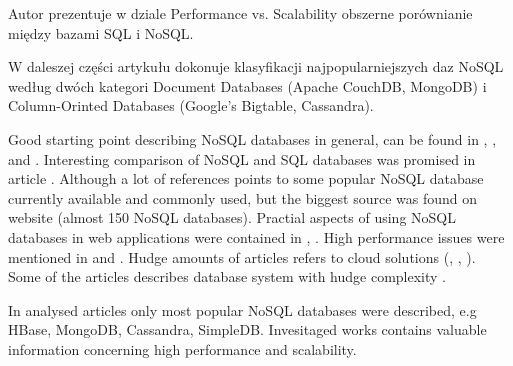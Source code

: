 \documentclass[times, 10pt,twocolumn]{article}
\begin{document}
Autor prezentuje w dziale Performance vs. Scalability obszerne porównianie między bazami SQL i NoSQL.  

W daleszej części artykułu dokonuje klasyfikacji najpopularniejszych daz NoSQL według 
dwóch kategori Document Databases (Apache CouchDB, MongoDB) i Column-Orinted Databases (Google’s Bigtable, Cassandra). 


\cite{tudorica}





Good starting point describing NoSQL databases in general, can be found in \cite{survey}, \cite{strauch}, \cite{leavittm} and \cite{prasad}. Interesting 
comparison of NoSQL and SQL databases was promised in article \cite{cattell}. Although a lot of references points to some popular NoSQL database currently 
available and commonly used, but the biggest source was found on website \cite{nosql-database} (almost 150 NoSQL databases). Practial aspects of using NoSQL 
databases in web applications were contained in \cite{tiwari} \cite{orend}, \cite{pokorny}. High performance issues were mentioned in \cite{taniar} and \cite{delis}.
Hudge amounts of articles refers to cloud solutions (\cite{sakr}, \cite{konstantinou}, \cite{delis}). Some of the articles describes database system with hudge 
complexity \cite{rizzotti}. 




In analysed articles only most popular NoSQL databases were described, e.g HBase, MongoDB, Cassandra, SimpleDB.
Invesitaged works contains valuable information concerning high performance and scalability. 






\end{document}
